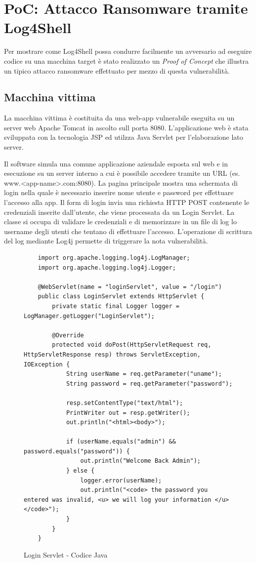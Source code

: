 \documentclass[a4paper, 12pt]{article}
\begin{document}
\newpage

\section{PoC: Attacco Ransomware tramite Log4Shell}
Per mostrare come Log4Shell possa condurre facilmente un avversario ad eseguire codice su una macchina target è stato realizzato un \emph{Proof of Concept} che illustra un tipico attacco ransomware effettuato per mezzo di questa vulnerabilità.


\subsection{Macchina vittima}
La macchina vittima è costituita da una web-app vulnerabile eseguita su un server web Apache Tomcat in ascolto sull porta 8080.
L'applicazione web è stata sviluppata con la tecnologia JSP ed utilzza Java Servlet per l'elaborazione lato server.

Il software simula una comune applicazione aziendale esposta sul web e in esecuzione su un server interno a cui è possibile accedere tramite un URL (es. www.<app-name>.com:8080).
La pagina principale mostra una schermata di login nella quale è necessario inserire nome utente e password per effettuare l'accesso alla app.
Il form di login invia una richiesta HTTP POST contenente le credenziali inserite dall'utente, che viene processata da un Login Servlet. La classe si occupa di validare le credenziali e di memorizzare in un file di log lo username degli utenti che tentano di effettuare l'accesso.
L'operazione di scrittura del log mediante Log4j permette di triggerare la nota vulnerabilità.

\begin{figure}
    \centering
    \begin{lstlisting}
    import org.apache.logging.log4j.LogManager;
    import org.apache.logging.log4j.Logger;
    
    @WebServlet(name = "loginServlet", value = "/login")
    public class LoginServlet extends HttpServlet {
        private static final Logger logger = LogManager.getLogger("LoginServlet");
    
        @Override
        protected void doPost(HttpServletRequest req, HttpServletResponse resp) throws ServletException, IOException {
            String userName = req.getParameter("uname");
            String password = req.getParameter("password");
    
            resp.setContentType("text/html");
            PrintWriter out = resp.getWriter();
            out.println("<html><body>");
    
            if (userName.equals("admin") && password.equals("password")) {
                out.println("Welcome Back Admin");
            } else {
                logger.error(userName);
                out.println("<code> the password you entered was invalid, <u> we will log your information </u> </code>");
            }
        }
    }
\end{lstlisting}
    \caption{Login Servlet - Codice Java}
    \label{fig:loginservlet}
\end{figure}
\end{document}

